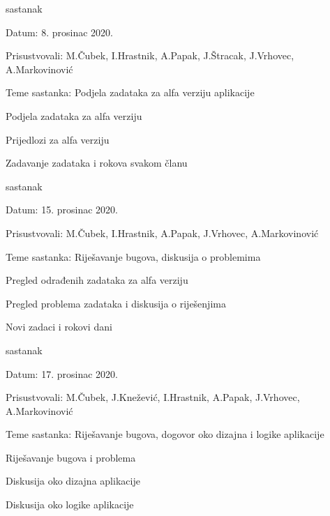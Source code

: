 \begin{packed_enum}
			\item  sastanak
			\item[] \begin{packed_item}
				\item Datum: 8. prosinac 2020.
				\item Prisustvovali: M.Čubek, I.Hrastnik, A.Papak, J.Štracak, J.Vrhovec, A.Markovinović
				\item Teme sastanka: Podjela zadataka za alfa verziju aplikacije
				\begin{packed_item}
					\item Podjela zadataka za alfa verziju
					\item Prijedlozi za alfa verziju
					\item Zadavanje zadataka i rokova svakom članu
					\item
				\end{packed_item}
			\end{packed_item}
			
			\item  sastanak
			\item[] \begin{packed_item}
				\item Datum: 15. prosinac 2020.
				\item Prisustvovali: M.Čubek, I.Hrastnik, A.Papak, J.Vrhovec, A.Markovinović
				\item Teme sastanka: Riješavanje bugova, diskusija o problemima
				\begin{packed_item}
					\item Pregled odrađenih zadataka za alfa verziju
					\item Pregled problema zadataka i diskusija o riješenjima
					\item Novi zadaci i rokovi dani
				\end{packed_item}
			\end{packed_item}
			
			\item  sastanak
			\item[] \begin{packed_item}
				\item Datum: 17. prosinac 2020.
				\item Prisustvovali: M.Čubek, J.Knežević, I.Hrastnik, A.Papak,  J.Vrhovec, A.Markovinović
				\item Teme sastanka: Riješavanje bugova, dogovor oko dizajna i logike aplikacije
				\begin{packed_item}
					\item Riješavanje bugova i problema
					\item Diskusija oko dizajna aplikacije
					\item Diskusija oko logike aplikacije
				\end{packed_item}
			\end{packed_item}
		

\end{packed_enum}
